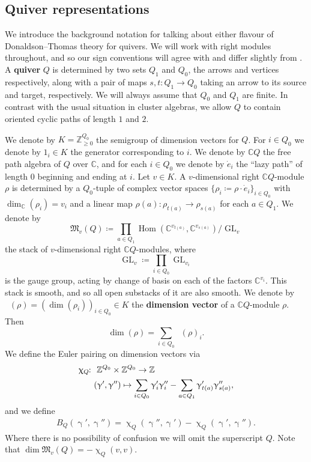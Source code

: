 \documentclass{amsart}
\newcommand{\lp}[1]{\dot{e}_{#1}}
\DeclareMathOperator{\Hom}{Hom}
\DeclareMathOperator{\GL}{GL}
\DeclareMathOperator{\udim}{\underline{\dim}}
\def\!{\mskip-\thinmuskip}
\let\bb=\mathbb
\let\f=\mathfrak
\newcommand{\g}[1]{1_{#1}}
\renewcommand{\gamma}{\upgamma}
\renewcommand{\chi}{\upchi}
\theoremstyle{plain}%
\theoremstyle{definition}
\theoremstyle{remark}
\begin{document}
\subsection{Quiver representations}
\label{quivers_sec}
We introduce the background notation for talking about either flavour of Donaldson--Thomas theory for quivers.  We will work with right modules throughout, and so our sign conventions will agree with \cite{DavPos} and differ slightly from \cite{DavMei}.  A \textbf{quiver} $Q$ is determined by two sets $Q_1$ and $Q_0$, the arrows and vertices respectively, along with a pair of maps $s,t\colon Q_1\rightarrow Q_0$ taking an arrow to its source and target, respectively.  We will always assume that $Q_0$ and $Q_1$ are finite.  In contrast with the usual situation in cluster algebras, we allow $Q$ to contain oriented cyclic paths of length $1$ and $2$.

We denote by $K=\mathbb{Z}_{\geq 0}^{Q_0}$ the semigroup of dimension vectors for $Q$.  For $i\in Q_0$ we denote by $\g{i}\in K$ the generator corresponding to $i$.  
We denote by $\mathbb{C}Q$ the free path algebra of $Q$ over $\mathbb{C}$, and for each $i\in Q_0$ we denote by $\lp{i}$ the ``lazy path'' of length $0$ beginning and ending at $i$.  Let $v\in K$.  A $v$-dimensional right $\mathbb{C}Q$-module $\rho$ is determined by a $Q_0$-tuple of complex vector spaces $\{\rho_i\coloneqq \rho\cdot \lp{i}\}_{i\in Q_0}$ with $\dim_{\mathbb{C}}(\rho_i)=v_i$
and a linear map $\rho(a)\colon \rho_{t(a)}\rightarrow \rho_{s(a)}$ for each $a\in Q_1$.  We denote by 
\begin{equation}
    \label{Qstackdef}
\mathfrak{M}_{v}(Q)\coloneqq \prod_{a\in Q_1}\Hom(\mathbb{C}^{v_{t(a)}},\mathbb{C}^{v_{s(a)}})/\GL_{v}
\end{equation}
the stack of $v$-dimensional right $\mathbb{C}Q$-modules, where
\[
\GL_{v}\coloneqq \prod_{i\in Q_0} \GL_{v_i}
\]
is the gauge group, acting by change of basis on each of the factors $\bb{C}^{v_i}$.  This stack is smooth, and so all open substacks of it are also smooth.  We denote by $\udim(\rho)=(\dim(\rho_i))_{i\in Q_0}\in K$ the \textbf{dimension vector} of a $\mathbb{C}Q$-module $\rho$.  Then
\[
\dim(\rho)=\sum_{i\in Q_0}\udim(\rho)_i.
\]
We define the Euler pairing on dimension vectors via
\begin{align*}
    \chi_Q\!\colon &\,\,\mathbb{Z}^{Q_0}\times\mathbb{Z}^{Q_0}\rightarrow \mathbb{Z}\\
    &(\gamma',\gamma'')\mapsto \sum_{i\in Q_0}\gamma'_i\gamma''_i-\sum_{a\in Q_1}\gamma'_{t(a)}\gamma''_{s(a)},
\end{align*}
and we define 
\begin{align}\label{BQ}
     B_Q( \gamma',\gamma'')=\chi_Q(\gamma'',\gamma')-\chi_Q(\gamma',\gamma'').
\end{align}
Where there is no possibility of confusion we will omit the superscript $Q$.  Note that $\dim \f{M}_v(Q)=-\chi_Q(v,v)$.
\end{document}

